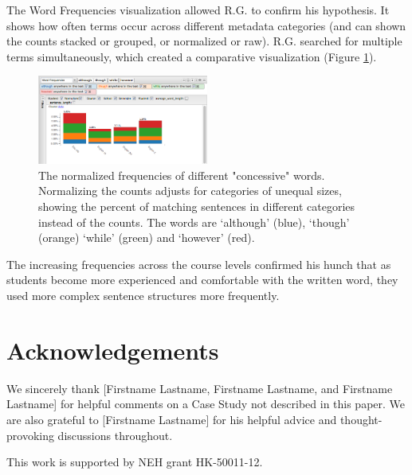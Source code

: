 \documentclass{sig-alternate}
\begin{document}
The Word Frequencies visualization allowed R.G. to confirm his hypothesis. It shows how often terms occur across different metadata categories (and can shown the counts stacked or grouped, or normalized or raw). R.G. searched for multiple terms simultaneously, which created a comparative visualization (Figure \ref{fig:rex05}).

\begin{figure}[h!]
\includegraphics[width=0.5\textwidth]{fig/rex/05.png}
\caption{The normalized frequencies of different "concessive" words. Normalizing the counts adjusts for categories of unequal sizes, showing the percent of matching sentences in different categories instead of the counts. The words are `although' (blue), `though' (orange) `while' (green) and `however' (red). \label{fig:rex05}}
\end{figure}

The increasing frequencies across the course levels confirmed his hunch that as students become more experienced and comfortable with the written word, they used more complex sentence structures more frequently. 


\section{Acknowledgements}
We sincerely thank [Firstname Lastname, Firstname Lastname, and Firstname Lastname] for helpful comments on a Case Study not described in this paper. We are also grateful to [Firstname Lastname] for his helpful advice and thought-provoking discussions throughout.

This work is supported by NEH grant HK-50011-12.


 
  
\end{document}
